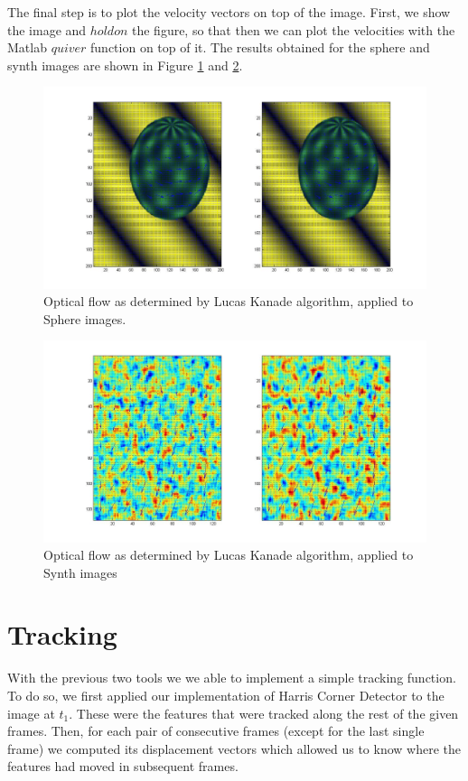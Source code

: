 \documentclass[11pt]{article}
\begin{document}
The final step is to plot the velocity vectors on top of the image. First, we show the image and $hold on$ the figure, so that then we can plot the velocities with the Matlab $quiver$ function on top of it. The results obtained for the sphere and synth images are shown in Figure \ref{fig:sphere_lucas} and \ref{fig:synth_lucas}.


\begin{figure}[H] \centering
	\includegraphics[width=.8\textwidth]{imgs/sphere.jpg}
	\caption{Optical flow as determined by Lucas Kanade algorithm, applied to Sphere images.}
	\label{fig:sphere_lucas}
\end{figure}

\begin{figure}[H] \centering
	\includegraphics[width=.8\textwidth]{imgs/synth.jpg}
	\caption{Optical flow as determined by Lucas Kanade algorithm, applied to Synth images}
	\label{fig:synth_lucas}
\end{figure}


\section{Tracking}
With the previous two tools we we able to implement a simple tracking function. To do so, we first applied our implementation of Harris Corner Detector to the image at $t_1$. These were the features that were tracked along the rest of the given frames.  Then, for each pair of consecutive frames (except for the last single frame) we computed its displacement vectors which allowed us to know where the features had moved in subsequent frames. 
\end{document}
